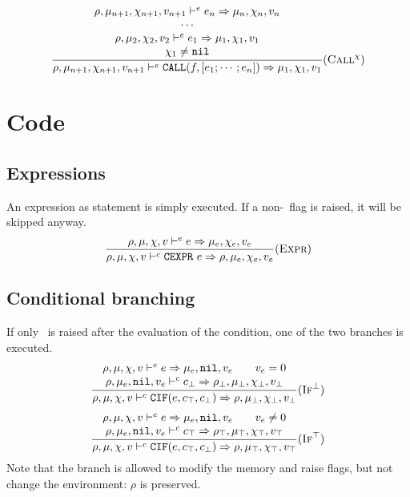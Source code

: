 \[\dfrac{\begin{array}{c}
    \rho,\mu_{n+1},\chi_{n+1},v_{n+1} \vdash^e e_n \Rightarrow \mu_n,\chi_n,v_n \\
    \cdots \\
    \rho,\mu_2,\chi_2,v_2 \vdash^e e_1 \Rightarrow \mu_1,\chi_1,v_1 \\
    \chi_1\ne\texttt{nil} \\
\end{array}}{\rho,\mu_{n+1},\chi_{n+1},v_{n+1} \vdash^e \texttt{CALL}(f, [e_1; \cdots; e_n]) \Rightarrow \mu_1,\chi_1,v_1} (\textsc{Call}^\chi)\]


\section{Code}
\subsection{Expressions}
An expression as statement is simply executed. If a non-\nil\ flag is raised, it will be skipped anyway.\\
\[\dfrac{
    \rho,\mu,\chi,v \vdash^e e \Rightarrow \mu_e,\chi_e,v_e
}{\rho,\mu,\chi,v \vdash^c \texttt{CEXPR}\ e \Rightarrow \rho,\mu_e,\chi_e,v_e}(\textsc{Expr})\]

\subsection{Conditional branching}
If only \nil\ is raised after the evaluation of the condition, one of the two branches is executed.
\[\dfrac{\begin{array}{c}
    \rho,\mu,\chi,v \vdash^e e \Rightarrow \mu_e,\texttt{nil},v_e \qquad v_e = 0 \\
    \rho,\mu_e,\texttt{nil},v_e \vdash^c c_\bot \Rightarrow \rho_\bot,\mu_\bot,\chi_\bot,v_\bot \\
\end{array}}{\rho,\mu,\chi,v \vdash^c \texttt{CIF}(e, c_\top, c_\bot) \Rightarrow \rho,\mu_\bot,\chi_\bot,v_\bot} (\textsc{If}^\bot)\]
\[\dfrac{\begin{array}{c}
    \rho,\mu,\chi,v \vdash^e e \Rightarrow \mu_e,\texttt{nil},v_e \qquad v_e \ne 0 \\
    \rho,\mu_e,\texttt{nil},v_e \vdash^c c_\top \Rightarrow \rho_\top,\mu_\top,\chi_\top,v_\top \\
\end{array}}{\rho,\mu,\chi,v \vdash^c \texttt{CIF}(e, c_\top, c_\bot) \Rightarrow \rho,\mu_\top,\chi_\top,v_\top} (\textsc{If}^\top)\]
Note that the branch is allowed to modify the memory and raise flags, but not change the environment: \(\rho\) is preserved.\\

